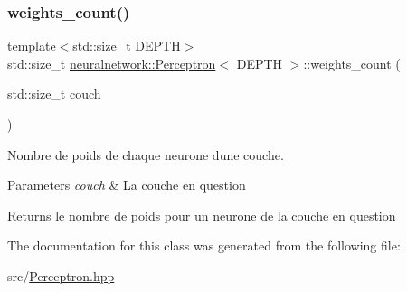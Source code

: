 \subsubsection{\texorpdfstring{weights\+\_\+count()}{weights\_count()}}
{\footnotesize\ttfamily template$<$std\+::size\+\_\+t D\+E\+P\+TH$>$ \\
std\+::size\+\_\+t \mbox{\hyperlink{classneuralnetwork_1_1_perceptron}{neuralnetwork\+::\+Perceptron}}$<$ D\+E\+P\+TH $>$\+::weights\+\_\+count (\begin{DoxyParamCaption}\item[{std\+::size\+\_\+t}]{couch }\end{DoxyParamCaption})}



Nombre de poids de chaque neurone d\textquotesingle{}une couche. 


\begin{DoxyParams}{Parameters}
{\em couch} & La couche en question \\
\hline
\end{DoxyParams}
\begin{DoxyReturn}{Returns}
le nombre de poids pour un neurone de la couche en question 
\end{DoxyReturn}


The documentation for this class was generated from the following file\+:\begin{DoxyCompactItemize}
\item 
src/\mbox{\hyperlink{_perceptron_8hpp}{Perceptron.\+hpp}}\end{DoxyCompactItemize}
